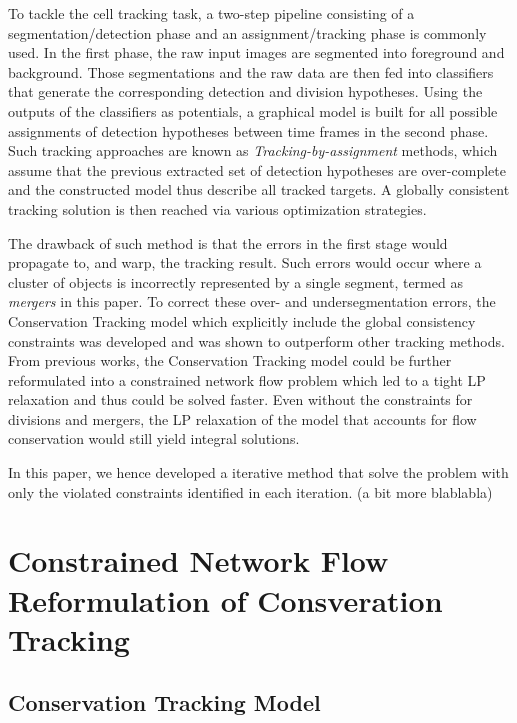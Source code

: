 \documentclass[10pt,twocolumn,letterpaper]{article}
\begin{document}
To tackle the cell tracking task, a two-step pipeline consisting of a segmentation/detection phase and an assignment/tracking phase is commonly used. In the first phase, the raw input images are segmented into foreground and background. Those segmentations and the raw data are then fed into classifiers that generate the corresponding detection and division hypotheses. Using the outputs of the classifiers as potentials, a graphical model is built for all possible assignments of  detection hypotheses between time frames in the second phase. Such tracking approaches are known as \textit{Tracking-by-assignment} methods, which assume that the previous extracted set of detection hypotheses are over-complete and the constructed model thus describe all tracked targets. A globally consistent tracking solution is then reached via various optimization strategies.

The drawback of such method is that the errors in the first stage would propagate to, and warp, the tracking result. Such errors would occur where a cluster of objects is incorrectly represented by a single segment, termed as \textit{mergers} in this paper. To correct these over- and undersegmentation errors, the Conservation Tracking model which explicitly include the global consistency constraints was developed and was shown to outperform other tracking methods. From previous works, the Conservation Tracking model could be further reformulated into a constrained network flow problem which led to a tight LP relaxation and thus could be solved faster. Even without the constraints for divisions and mergers, the LP relaxation of the model that accounts for flow conservation would still yield integral solutions.

In this paper, we hence developed a iterative method that solve the problem with only the violated constraints identified in each iteration. (a bit more blablabla)


\section{Constrained Network Flow Reformulation of Consveration Tracking}


\subsection{Conservation Tracking Model}
\end{document}
